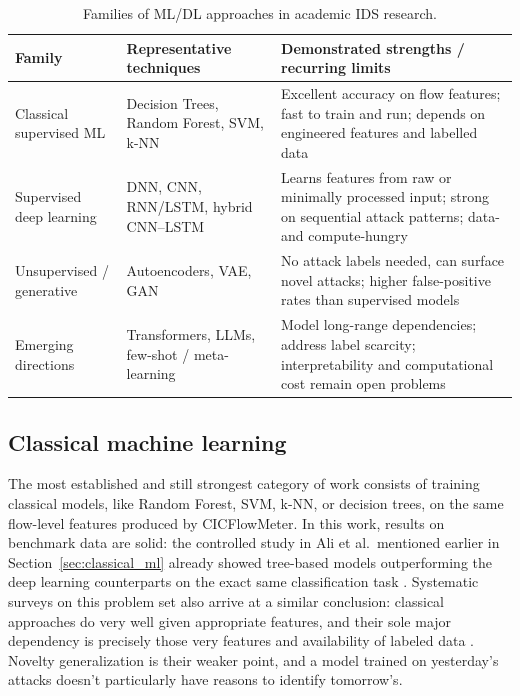 \begin{table}[H]
  \centering
  \caption{Families of ML/DL approaches in academic IDS research.}
  \label{tab:ids_taxonomy}
  \renewcommand{\arraystretch}{1.4}
  \begin{tabularx}{\textwidth}{lXX}
    \toprule
    \textbf{Family} & \textbf{Representative techniques} & \textbf{Demonstrated strengths / recurring limits} \\
    \midrule
    Classical supervised ML
      & Decision Trees, Random Forest, SVM, k-NN
      & Excellent accuracy on flow features; fast to train and run;
        depends on engineered features and labelled data \\
    \midrule
    Supervised deep learning
      & DNN, CNN, RNN/LSTM, hybrid CNN--LSTM
      & Learns features from raw or minimally processed input;
        strong on sequential attack patterns; data- and compute-hungry \\
    \midrule
    Unsupervised / generative
      & Autoencoders, VAE, GAN
      & No attack labels needed, can surface novel attacks;
        higher false-positive rates than supervised models \\
    \midrule
    Emerging directions
      & Transformers, LLMs, few-shot / meta-learning
      & Model long-range dependencies; address label scarcity;
        interpretability and computational cost remain open problems \\
    \bottomrule
  \end{tabularx}
\end{table}
 

\subsection{Classical machine learning}
\label{sec:ids_classical}

The most established and still strongest category of work consists of training classical models, like Random Forest, SVM, k-NN, or decision trees, on the same flow-level features produced by CICFlowMeter. In this work, results on benchmark data are solid: the controlled study in Ali et al.\ mentioned earlier in Section~\ref{sec:classical_ml} already showed tree-based models outperforming the deep learning counterparts on the exact same classification task \cite{ali2025dlvsml}. Systematic surveys on this problem set also arrive at a similar conclusion: classical approaches do very well given appropriate features, and their sole major dependency is precisely those very features and availability of labeled data \cite{ahmad2021network}. Novelty generalization is their weaker point, and a model trained on yesterday's attacks doesn't particularly have reasons to identify tomorrow's.

